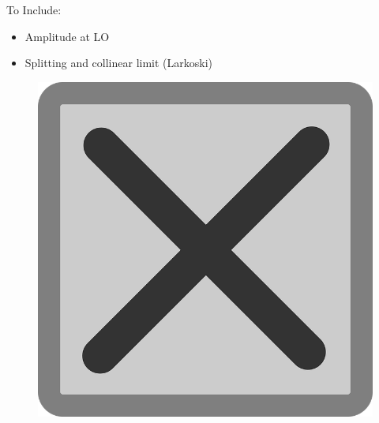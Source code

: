 
\begin{sambox}{To Include:}{}
    \begin{itemize}
        \item
            Amplitude at LO

        \item
            Splitting and collinear limit
            (Larkoski)
    \end{itemize}
\end{sambox}

\begin{figure}[t!]
    \centering
    \includegraphics[width=\textwidth]{figures/tempfig}

    \caption{
    }

    \label{fig:cross_section}
\end{figure}


